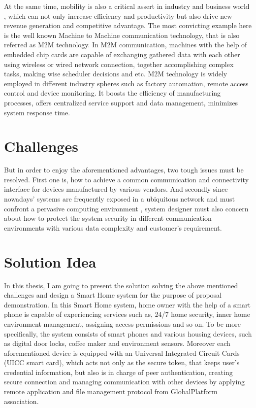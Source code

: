 At the same time, mobility is also a critical assert in industry and business world , which can not only increase efficiency and productivity but also drive new revenue generation and competitive advantage. The most convicting example here is the well known Machine to Machine communication technology, that is also referred as M2M technology. In M2M communication, machines  with the help of embedded chip cards are capable of  exchanging gathered data with each other using wireless or wired network connection, together accomplishing complex tasks, making wise scheduler decisions and etc. M2M technology is widely employed in different industry spheres such as factory automation, remote access control and device monitoring. It boosts the efficiency of manufacturing processes, offers centralized service support and data management, minimizes system response time.

\section{Challenges}
But in order to enjoy the aforementioned advantages, two tough issues must be resolved. First one is, how to achieve a common communication and connectivity interface for devices manufactured by various vendors. And secondly since nowadays' systems are frequently exposed in a ubiquitous network and must confront a pervasive computing environment \cite{embedded_secure}, system designer must also concern about how to protect the system security in different communication environments with various data complexity and customer's requirement.

\section{Solution Idea}\label{secSolutionIdea}
In this thesis, I am going to present the solution solving the above mentioned challenges and design a Smart Home system for the purpose of proposal demonstration. In this Smart Home system, home owner with the help of a smart phone is capable of experiencing services such as, 24/7 home security, inner home environment management, assigning access permissions and so on. To be more specifically, the system consists of smart phones and various housing devices, such as digital door locks, coffee maker and environment sensors. Moreover each aforementioned device is equipped with an Universal Integrated Circuit Cards (UICC smart card), which acts not only as the secure token, that keeps user's credential information, but also is in charge of peer authentication, creating secure connection and managing communication with other devices by applying remote application and file management protocol from GlobalPlatform association.

